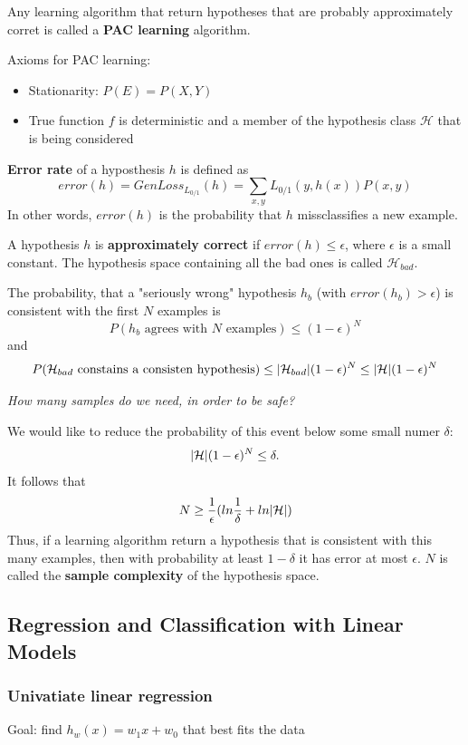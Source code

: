 \documentclass{scrartcl}
\DeclarePairedDelimiter\abs{\lvert}{\rvert}%
\begin{document}
Any learning algorithm that return hypotheses that are probably approximately corret is called a \textbf{PAC learning} algorithm.

Axioms for PAC learning:
\begin{itemize}
    \item
        Stationarity: \(P(E) = P(X, Y)\) 
    \item
        True function \(f\) is deterministic and a member of the hypothesis class \(\mathcal{H}\) that is being considered
\end{itemize}

\bigbreak

\textbf{Error rate} of a hyposthesis \(h\) is defined as
\[error(h) = GenLoss_{L_{0/1}}(h) = \sum_{x,y} L_{0/1}(y, h(x)) P(x,y)\]
In other words, \(error(h)\) is the probability that \(h\) missclassifies a new example.

A hypothesis \(h\) is \textbf{approximately correct} if \(error(h) \leq \epsilon\), where \(\epsilon\) is a small constant. The hypothesis space containing all the bad ones is called \(\mathcal{H}_{bad}\).

\bigbreak

The probability, that a "seriously wrong" hypothesis \(h_b\) (with \(error(h_b) > \epsilon\)) is consistent with the first \(N\) examples is
\[P(h_b \text{ agrees with \(N\) examples}) \leq (1-\epsilon)^N\]
and
\[P(\mathcal{H}_{bad} \text{ constains a consisten hypothesis)} \leq \abs{\mathcal{H}_{bad}} (1-\epsilon)^N \leq \abs{\mathcal{H}} (1-\epsilon)^N\]

\textit{How many samples do we need, in order to be safe?}

We would like to reduce the probability of this event below some small numer \(\delta\):
\[\abs{\mathcal{H}} (1-\epsilon)^N \leq \delta.\]
It follows that
\[N \geq \frac{1}{\epsilon} (ln\frac{1}{\delta} + ln \abs{\mathcal{H}})\]
Thus, if a learning algorithm return a hypothesis that is consistent with this many examples, then with probability at least \(1-\delta\) it has error at most \(\epsilon\). \(N\) is called the \textbf{sample complexity} of the hypothesis space.

\subsection{Regression and Classification with Linear Models}
\subsubsection{Univatiate linear regression}
Goal: find \(h_w(x) = w_1 x + w_0\) that best fits the data
\end{document}
